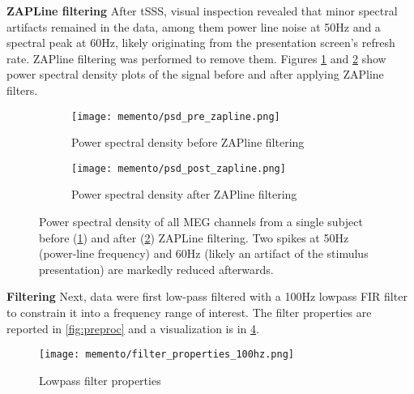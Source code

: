 \textbf{ZAPLine filtering} After \gls{tSSS}, visual inspection revealed that minor spectral artifacts remained in the data, among them power line noise at 50Hz and a spectral peak at 60Hz, likely originating from the presentation screen's refresh rate.
ZAPline filtering \citep{de2020zapline} was performed to remove them.
Figures \ref{fig:prezap} and \ref{fig:postzap} show power spectral density plots of the signal before and after applying ZAPline filters.


\begin{figure}
	\begin{subfigure}{.49\textwidth}
		\texttt{[image: memento/psd\_pre\_zapline.png]}
		\caption{Power spectral density before ZAPline filtering}
		\label{fig:prezap}
	\end{subfigure}
	\begin{subfigure}{.49\textwidth}
		\texttt{[image: memento/psd\_post\_zapline.png]}
		\caption{Power spectral density after ZAPline filtering}
		\label{fig:postzap}
	\end{subfigure}
	\caption[Power spectral density before and after ZAPLine filtering]{Power spectral density of all MEG channels
		from a single subject before (\ref{fig:prezap}) and after (\ref{fig:postzap}) ZAPLine filtering.
		Two spikes at 50Hz (power-line frequency) and 60Hz (likely an artifact of the stimulus presentation) are markedly reduced afterwards.
	}
	\label{fig:zapline_psd}
\end{figure}

\textbf{Filtering} Next, data were first low-pass filtered with a 100Hz lowpass FIR filter to constrain it into a frequency range of interest.
The filter properties are reported in \ref{fig:preproc} and a visualization is in \ref{fig:filter}.

\begin{figure}
	\centering
	\texttt{[image: memento/filter\_properties\_100hz.png]}
	\caption[Lowpass filter properties]{Lowpass filter properties}
	\label{fig:filter}
\end{figure}


